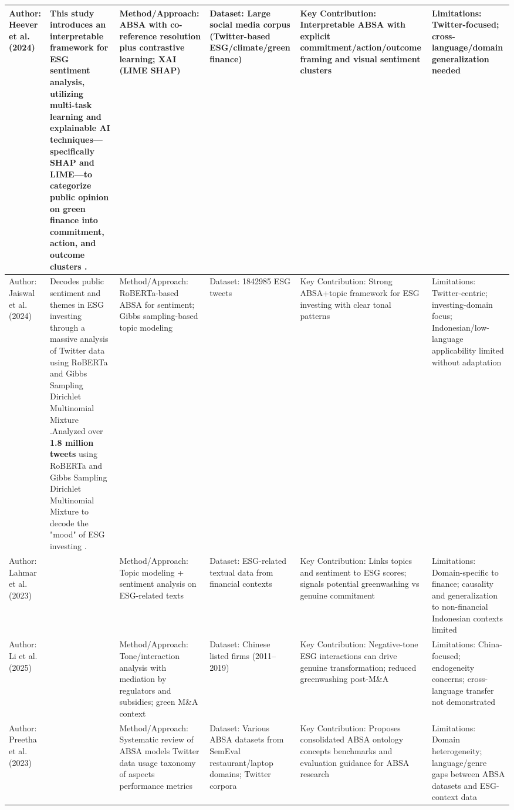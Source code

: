 \documentclass{article}
\begin{document}
\begin{landscape}
\begin{longtable}{p{1.8cm}
p{2.6cm}
p{3.4cm}
p{2.6cm}
p{3.5cm}
p{3.5cm}}
Author: Heever et al. (2024) & This study introduces an interpretable framework for ESG sentiment analysis, utilizing multi-task learning and explainable AI techniques—specifically SHAP and LIME—to categorize public opinion on green finance into commitment, action, and outcome clusters  \parencite{wihan_van_der_heever_44c76c99}. & Method/Approach: ABSA with co-reference resolution plus contrastive learning; XAI (LIME SHAP) & Dataset: Large social media corpus (Twitter-based ESG/climate/green finance) & Key Contribution: Interpretable ABSA with explicit commitment/action/outcome framing and visual sentiment clusters & Limitations: Twitter-focused; cross-language/domain generalization needed \\ \hline
Author: Jaiswal et al. (2024) & Decodes public sentiment and themes in ESG investing through a massive analysis of Twitter data using RoBERTa and Gibbs Sampling Dirichlet Multinomial Mixture  \parencite{rachana_jaiswal_8eee1b17}.Analyzed over \textbf{1.8 million tweets} using RoBERTa and Gibbs Sampling Dirichlet Multinomial Mixture to decode the "mood" of ESG investing  \parencite{rachana_jaiswal_8eee1b17}. & Method/Approach: RoBERTa-based ABSA for sentiment; Gibbs sampling-based topic modeling & Dataset: 1842985 ESG tweets & Key Contribution: Strong ABSA+topic framework for ESG investing with clear tonal patterns & Limitations: Twitter-centric; investing-domain focus; Indonesian/low-language applicability limited without adaptation \\ \hline
Author: Lahmar et al. (2023) & ~ & Method/Approach: Topic modeling + sentiment analysis on ESG-related texts & Dataset: ESG-related textual data from financial contexts & Key Contribution: Links topics and sentiment to ESG scores; signals potential greenwashing vs genuine commitment & Limitations: Domain-specific to finance; causality and generalization to non-financial Indonesian contexts limited \\ \hline
Author: Li et al. (2025) & ~ & Method/Approach: Tone/interaction analysis with mediation by regulators and subsidies; green M\&A context & Dataset: Chinese listed firms (2011–2019) & Key Contribution: Negative-tone ESG interactions can drive genuine transformation; reduced greenwashing post-M\&A & Limitations: China-focused; endogeneity concerns; cross-language transfer not demonstrated \\ \hline
Author: Preetha et al. (2023) & ~ & Method/Approach: Systematic review of ABSA models Twitter data usage taxonomy of aspects performance metrics & Dataset: Various ABSA datasets from SemEval restaurant/laptop domains; Twitter corpora & Key Contribution: Proposes consolidated ABSA ontology concepts benchmarks and evaluation guidance for ABSA research & Limitations: Domain heterogeneity; language/genre gaps between ABSA datasets and ESG-context data \\ \hline

\end{longtable}
\end{landscape}
\end{document}
